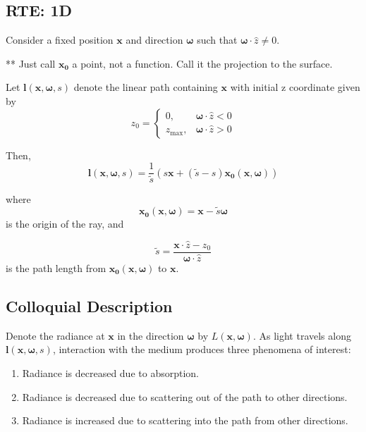 \documentclass[10pt]{article}
\newcommand\zmax{z_{\mbox{max}}}
\renewcommand\vec{\mathbf}
\begin{document}
\subsection{RTE: 1D}
Consider a fixed position $\vec{x}$ and direction $\vec{\omega}$ such that
$\vec{\omega} \cdot \hat{z} \neq 0$.

** Just call $\vec{x_0}$ a point, not a function. Call it the projection to the surface.

Let $\vec{l}(\vec{x}, \vec{\omega}, s)$ denote the linear path containing $\vec{x}$
with initial z coordinate given by
\begin{equation}
  z_0 =
   \begin{cases}
    0, & \vec{\omega} \cdot \hat{z} < 0 \\
    \zmax, & \vec{\omega} \cdot \hat{z} > 0
  \end{cases}
\end{equation}

Then,
\begin{equation}
  \vec{l}(\vec{x}, \vec{\omega}, s) = \frac{1}{\tilde{s}} (s\vec{x} + (\tilde{s} - s)\vec{x_0}(\vec{x}, \vec{\omega}))
\end{equation}

where
\begin{equation}
  \vec{x_0}(\vec{x}, \vec{\omega}) = \vec{x} - \tilde{s} \vec{\omega}
\end{equation}
is the origin of the ray, and 

\begin{equation}
  \tilde{s} = \frac{\vec{x} \cdot \hat{z} - z_0}{\vec{\omega} \cdot \hat{z}}
\end{equation}
is the path length from $\vec{x_0}(\vec{x}, \vec{\omega})$ to $\vec{x}$.

\subsection{Colloquial Description}
Denote the radiance at $\vec{x}$ in the direction $\vec{\omega}$ by $L(\vec{x}, \vec{\omega})$.
As light travels along $\vec{l}(\vec{x}, \vec{\omega}, s)$, interaction with the
medium produces three phenomena of interest:
\begin{enumerate}
  \item Radiance is decreased due to absorption.
  \item Radiance is decreased due to scattering out of the path to other
    directions.
  \item Radiance is increased due to scattering into the path from other
      directions.
\end{enumerate}
\end{document}
